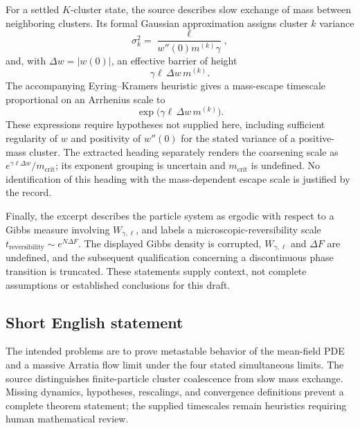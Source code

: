 \documentclass[11pt]{article}
\begin{document}
For a settled \(K\)-cluster state, the source describes slow exchange of mass between neighboring clusters. Its formal Gaussian approximation assigns cluster \(k\) variance
\[
\sigma_k^2=\frac{\ell}{w''(0)m^{(k)}\gamma},
\]
and, with \(\Delta w=|w(0)|\), an effective barrier of height
\[
\gamma\ell\,\Delta w\,m^{(k)}.
\]
The accompanying Eyring--Kramers heuristic gives a mass-escape timescale proportional on an Arrhenius scale to
\[
\exp\!\bigl(\gamma\ell\,\Delta w\,m^{(k)}\bigr).
\]
These expressions require hypotheses not supplied here, including sufficient regularity of \(w\) and positivity of \(w''(0)\) for the stated variance of a positive-mass cluster. The extracted heading separately renders the coarsening scale as \(e^{\gamma\ell\Delta w}/m_{\mathrm{crit}}\); its exponent grouping is uncertain and \(m_{\mathrm{crit}}\) is undefined. No identification of this heading with the mass-dependent escape scale is justified by the record.

Finally, the excerpt describes the particle system as ergodic with respect to a Gibbs measure involving \(W_{\gamma,\ell}\), and labels a microscopic-reversibility scale \(t_{\mathrm{reversibility}}\sim e^{N\Delta F}\). The displayed Gibbs density is corrupted, \(W_{\gamma,\ell}\) and \(\Delta F\) are undefined, and the subsequent qualification concerning a discontinuous phase transition is truncated. These statements supply context, not complete assumptions or established conclusions for this draft.
\subsection{Short English statement}
The intended problems are to prove metastable behavior of the mean-field PDE and a massive Arratia flow limit under the four stated simultaneous limits. The source distinguishes finite-particle cluster coalescence from slow mass exchange. Missing dynamics, hypotheses, rescalings, and convergence definitions prevent a complete theorem statement; the supplied timescales remain heuristics requiring human mathematical review.
\end{document}
